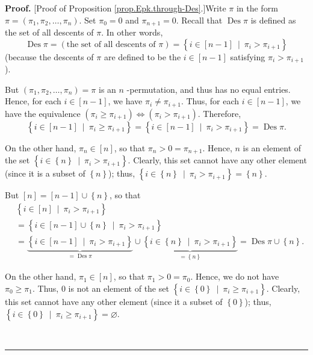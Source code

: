 \documentclass[numbers=enddot,12pt,final,onecolumn,notitlepage]{scrartcl}%
\theoremstyle{definition}
\newenvironment{proof}[1][Proof]{\noindent\textbf{#1.} }{\ \rule{0.5em}{0.5em}}
\newenvironment{verlong}{}{}
\begin{document}
\begin{verlong}
\begin{proof}
[Proof of Proposition \ref{prop.Epk.through-Des}.]Write $\pi$ in the form
$\pi=\left(  \pi_{1},\pi_{2},\ldots,\pi_{n}\right)  $. Set $\pi_{0}=0$ and
$\pi_{n+1}=0$. Recall that $\operatorname*{Des}\pi$ is defined as the set of
all descents of $\pi$. In other words,%
\[
\operatorname*{Des}\pi=\left(  \text{the set of all descents of }\pi\right)
=\left\{  i\in\left[  n-1\right]  \ \mid\ \pi_{i}>\pi_{i+1}\right\}
\]
(because the descents of $\pi$ are defined to be the $i\in\left[  n-1\right]
$ satisfying $\pi_{i}>\pi_{i+1}$).

But $\left(  \pi_{1},\pi_{2},\ldots,\pi_{n}\right)  =\pi$ is an $n$%
-permutation, and thus has no equal entries. Hence, for each $i\in\left[
n-1\right]  $, we have $\pi_{i}\neq\pi_{i+1}$. Thus, for each $i\in\left[
n-1\right]  $, we have the equivalence $\left(  \pi_{i}\geq\pi_{i+1}\right)
\Longleftrightarrow\left(  \pi_{i}>\pi_{i+1}\right)  $. Therefore,%
\[
\left\{  i\in\left[  n-1\right]  \ \mid\ \pi_{i}\geq\pi_{i+1}\right\}
=\left\{  i\in\left[  n-1\right]  \ \mid\ \pi_{i}>\pi_{i+1}\right\}
=\operatorname*{Des}\pi.
\]


On the other hand, $\pi_{n}\in\left[  n\right]  $, so that $\pi_{n}%
>0=\pi_{n+1}$. Hence, $n$ is an element of the set $\left\{  i\in\left\{
n\right\}  \ \mid\ \pi_{i}>\pi_{i+1}\right\}  $. Clearly, this set cannot have
any other element (since it is a subset of $\left\{  n\right\}  $); thus,
$\left\{  i\in\left\{  n\right\}  \ \mid\ \pi_{i}>\pi_{i+1}\right\}  =\left\{
n\right\}  $.

But $\left[  n\right]  =\left[  n-1\right]  \cup\left\{  n\right\}  $, so
that
\begin{align}
&  \left\{  i\in\left[  n\right]  \ \mid\ \pi_{i}>\pi_{i+1}\right\}
\nonumber\\
&  =\left\{  i\in\left[  n-1\right]  \cup\left\{  n\right\}  \ \mid\ \pi
_{i}>\pi_{i+1}\right\} \nonumber\\
&  =\underbrace{\left\{  i\in\left[  n-1\right]  \ \mid\ \pi_{i}>\pi
_{i+1}\right\}  }_{=\operatorname*{Des}\pi}\cup\underbrace{\left\{
i\in\left\{  n\right\}  \ \mid\ \pi_{i}>\pi_{i+1}\right\}  }_{=\left\{
n\right\}  }=\operatorname*{Des}\pi\cup\left\{  n\right\}  .
\label{pf.prop.Epk.through-Des.Desun}%
\end{align}


On the other hand, $\pi_{1}\in\left[  n\right]  $, so that $\pi_{1}>0=\pi_{0}%
$. Hence, we do not have $\pi_{0}\geq\pi_{1}$. Thus, $0$ is not an element of
the set $\left\{  i\in\left\{  0\right\}  \ \mid\ \pi_{i}\geq\pi
_{i+1}\right\}  $. Clearly, this set cannot have any other element (since it a
subset of $\left\{  0\right\}  $); thus, $\left\{  i\in\left\{  0\right\}
\ \mid\ \pi_{i}\geq\pi_{i+1}\right\}  =\varnothing$.


\end{proof}
\end{verlong}
\end{document}
